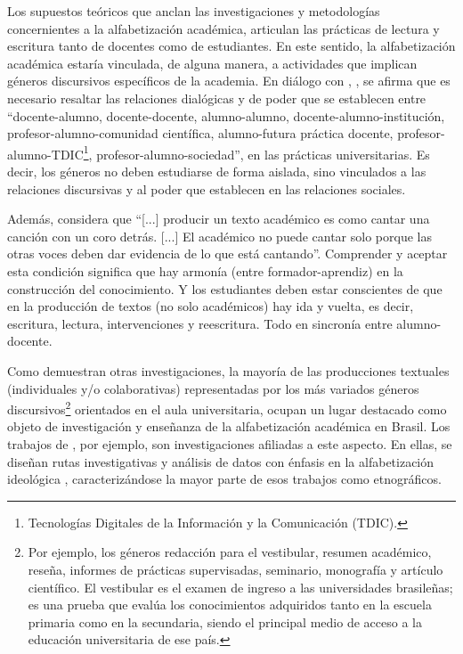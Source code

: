 \documentclass{textolivre}
\begin{document}
Los supuestos teóricos que anclan las investigaciones y metodologías concernientes a la alfabetización académica, articulan las prácticas de lectura y escritura tanto de docentes como de estudiantes. En este sentido, la alfabetización académica estaría vinculada, de alguna manera, a actividades que implican géneros discursivos específicos de la academia. En diálogo con \textcite{lillis_student_2003}, \textcite[p. 37]{fiad_letramentos_2014}, se afirma que es necesario resaltar las relaciones dialógicas y de poder que se establecen entre “docente-alumno, docente-docente, alumno-alumno, docente-alumno-institución, profesor-alumno-comunidad científica, alumno-futura práctica docente, profesor-alumno-TDIC\footnote{Tecnologías Digitales de la Información y la Comunicación (TDIC).}, profesor-alumno-sociedad”, en las prácticas universitarias. Es decir, los géneros no deben estudiarse de forma aislada, sino vinculados a las relaciones discursivas \cite{lillis_student_2003} y al poder que establecen en las relaciones sociales.

Además, \textcite[p. 76]{zavala_quem_2010} considera que “[...] producir un texto académico es como cantar una canción con un coro detrás. [...] El académico no puede cantar solo porque las otras voces deben dar evidencia de lo que está cantando”. Comprender y aceptar esta condición significa que hay armonía (entre formador-aprendiz) en la construcción del conocimiento. Y los estudiantes deben estar conscientes de que en la producción de textos (no solo académicos) hay ida y vuelta, es decir, escritura, lectura, intervenciones y reescritura. Todo en sincronía entre alumno-docente.

Como demuestran otras investigaciones, la mayoría de las producciones textuales (individuales y/o colaborativas) representadas por los más variados géneros discursivos\footnote{Por ejemplo, los géneros redacción para el vestibular, resumen académico, reseña, informes de prácticas supervisadas, seminario, monografía y artículo científico. El vestibular es el examen de ingreso a las universidades brasileñas; es una prueba que evalúa los conocimientos adquiridos tanto en la escuela primaria como en la secundaria, siendo el principal medio de acceso a la educación universitaria de ese país.} orientados en el aula universitaria, ocupan un lugar destacado como objeto de investigación y enseñanza de la alfabetización académica en Brasil. Los trabajos de \textcite{marinho_escrita_2010, araujo_2013, fiad_letramentos_2014, santos_letramento_2020}, por ejemplo, son investigaciones afiliadas a este aspecto. En ellas, se diseñan rutas investigativas y análisis de datos con énfasis en la alfabetización ideológica \cite{street_literacy_1984, street_letramentos_2014}, caracterizándose la mayor parte de esos trabajos como etnográficos.
\end{document}
